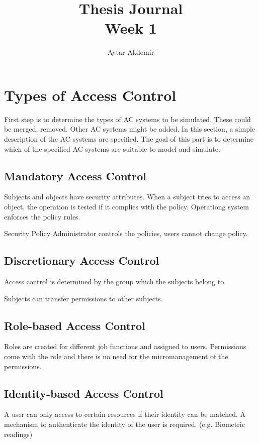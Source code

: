 \documentclass[11pt]{article} %
\title{Thesis Journal \\ Week 1}
\author{Aytar Akdemir}
\begin{document}
\maketitle

\section{Types of Access Control}

First step is to determine the types of AC systems to be simulated. These could be merged, removed. Other AC systems might be added. In this section, a simple description of the AC systems are specified. The goal of this part is to determine which of the specified AC systems are suitable to model and simulate.

\subsection{Mandatory Access Control}

Subjects and objects have security attributes. When a subject tries to access an object, the operation is tested if it complies with the policy. Operationg system enforces the policy rules.

Security Policy Administrator controls the policies, users cannot change policy.

\subsection{Discretionary Access Control}
Access control is determined by the group which the subjects belong to.

Subjects can transfer permissions to other subjects.

\subsection{Role-based Access Control}

Roles are created for different job functions and assigned to users. Permissions come with the role and there is no need for the micromanagement of the permissions.


\subsection{Identity-based Access Control}

A user can only access to certain resources if their identity can be matched. A mechanism to authenticate the identity of the user is required. (e.g. Biometric readings)
\end{document}
